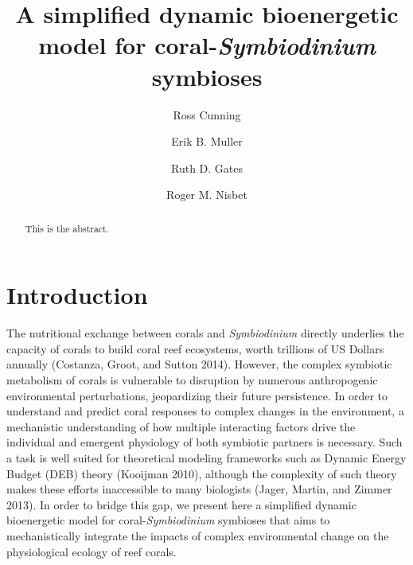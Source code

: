 \documentclass[]{elsarticle} %
\begin{document}
\begin{frontmatter}

  \title{A simplified dynamic bioenergetic model for coral-\emph{Symbiodinium}
symbioses}
    \author[University of Hawaii]{Ross Cunning}
    \author[University of California]{Erik B. Muller}
  
  
    \author[University of Hawaii]{Ruth D. Gates}
  
  
    \author[University of California]{Roger M. Nisbet}
  
  
      \address[University of Hawaii]{Hawaii Institute of Marine Biology, Kaneohe, HI 96744, USA}
    \address[University of California]{Department of Ecology, Evolution, and Marine Biology, Santa Barbara, CA
93106, USA}
  
  \begin{abstract}
  This is the abstract.
  \end{abstract}
  
 \end{frontmatter}

\section{Introduction}\label{introduction}

The nutritional exchange between corals and \emph{Symbiodinium} directly
underlies the capacity of corals to build coral reef ecosystems, worth
trillions of US Dollars annually (Costanza, Groot, and Sutton 2014).
However, the complex symbiotic metabolism of corals is vulnerable to
disruption by numerous anthropogenic environmental perturbations,
jeopardizing their future persistence. In order to understand and
predict coral responses to complex changes in the environment, a
mechanistic understanding of how multiple interacting factors drive the
individual and emergent physiology of both symbiotic partners is
necessary. Such a task is well suited for theoretical modeling
frameworks such as Dynamic Energy Budget (DEB) theory (Kooijman 2010),
although the complexity of such theory makes these efforts inaccessible
to many biologists (Jager, Martin, and Zimmer 2013). In order to bridge
this gap, we present here a simplified dynamic bioenergetic model for
coral-\emph{Symbiodinium} symbioses that aims to mechanistically
integrate the impacts of complex environmental change on the
physiological ecology of reef corals.
\end{document}
